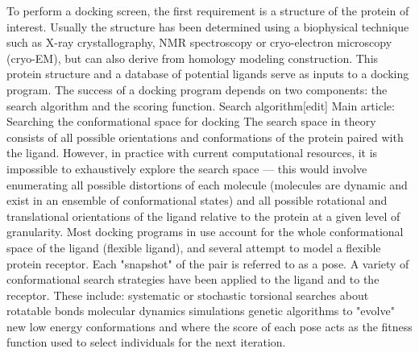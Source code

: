 To perform a docking screen, the first requirement is a structure of the protein of interest. Usually the structure has been determined using a biophysical technique such as X-ray crystallography, NMR spectroscopy or cryo-electron microscopy (cryo-EM), but can also derive from homology modeling construction. This protein structure and a database of potential ligands serve as inputs to a docking program. The success of a docking program depends on two components: the search algorithm and the scoring function.
Search algorithm[edit]
Main article: Searching the conformational space for docking
The search space in theory consists of all possible orientations and conformations of the protein paired with the ligand. However, in practice with current computational resources, it is impossible to exhaustively explore the search space — this would involve enumerating all possible distortions of each molecule (molecules are dynamic and exist in an ensemble of conformational states) and all possible rotational and translational orientations of the ligand relative to the protein at a given level of granularity. Most docking programs in use account for the whole conformational space of the ligand (flexible ligand), and several attempt to model a flexible protein receptor. Each "snapshot" of the pair is referred to as a pose.
A variety of conformational search strategies have been applied to the ligand and to the receptor. These include:
systematic or stochastic torsional searches about rotatable bonds
molecular dynamics simulations
genetic algorithms to "evolve" new low energy conformations and where the score of each pose acts as the fitness function used to select individuals for the next iteration.

